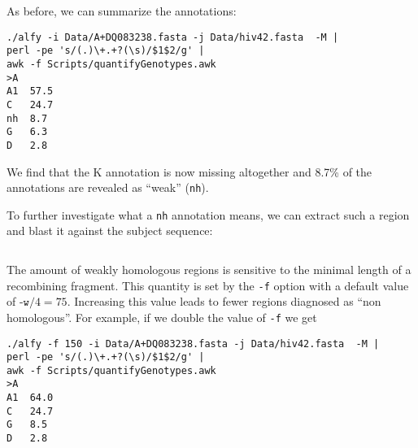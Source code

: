 \documentclass{article}
\newcommand{\I}{\item}
\newcommand{\ty}{\texttt}
\begin{document}
\I As before, we can summarize the annotations:
\begin{verbatim}
./alfy -i Data/A+DQ083238.fasta -j Data/hiv42.fasta  -M |
perl -pe 's/(.)\+.+?(\s)/$1$2/g' | 
awk -f Scripts/quantifyGenotypes.awk
>A
A1	57.5
C	24.7
nh	8.7
G	6.3
D	2.8
\end{verbatim}
We find that the K annotation  is now missing altogether and 8.7\% of
the annotations are revealed as ``weak'' (\ty{nh}).
\I To further investigate what a \ty{nh} annotation means, we can
extract such a region and blast it against the subject sequence:
\begin{verbatim}
\end{verbatim}
\I The amount of weakly homologous regions is sensitive to the minimal
length of a recombining fragment. This quantity is set by the \ty{-f}
option with a default value of $\ty{-w}/4=75$. Increasing this value
leads to fewer regions diagnosed as ``non homologous''. For example,
if we double the value of \ty{-f} we get
\begin{verbatim}
./alfy -f 150 -i Data/A+DQ083238.fasta -j Data/hiv42.fasta  -M |
perl -pe 's/(.)\+.+?(\s)/$1$2/g' | 
awk -f Scripts/quantifyGenotypes.awk
>A
A1	64.0
C	24.7
G	8.5
D	2.8
\end{verbatim}
\end{document}
